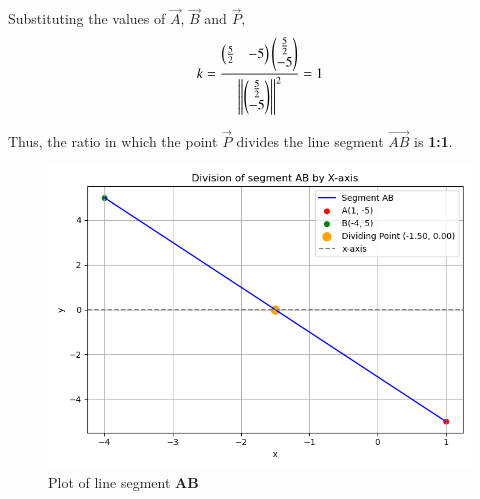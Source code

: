 \documentclass[journal]{IEEEtran}
\begin{document}
Substituting the values of $\vec{A}$, $\vec{B}$ and $\vec{P}$,
\begin{align}
k=\frac{\begin{pmatrix}\frac{5}{2} & -5\end{pmatrix}\begin{pmatrix}\frac{5}{2} \\ -5\end{pmatrix}}{\left\lVert\begin{pmatrix}\frac{5}{2} \\ -5\end{pmatrix}\right\rVert^2}=1
\end{align}

Thus, the ratio in which the point $\vec{P}$ divides the line segment $\vec{AB}$ is \textbf{1:1}. 

\begin{figure}
   \centering
   \includegraphics[width=1\columnwidth]{figs/points.png}
   \caption{Plot of line segment \textbf{AB}}
   \label{}
\end{figure}
\end{document}

